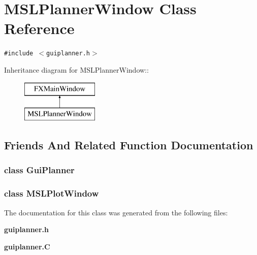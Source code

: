 \section{MSLPlanner\-Window  Class Reference}
\label{classMSLPlannerWindow}
{\tt \#include $<$guiplanner.h$>$}

Inheritance diagram for MSLPlanner\-Window::\begin{figure}[H]
\begin{center}
\leavevmode
\includegraphics[height=2cm]{classMSLPlannerWindow}
\end{center}
\end{figure}


\subsection{Friends And Related Function Documentation}
\subsubsection{\setlength{\rightskip}{0pt plus 5cm}class Gui\-Planner\hspace{0.3cm}{\tt  [friend]}}\label{classMSLPlannerWindow_l0}


\subsubsection{\setlength{\rightskip}{0pt plus 5cm}class MSLPlot\-Window\hspace{0.3cm}{\tt  [friend]}}\label{classMSLPlannerWindow_l1}




The documentation for this class was generated from the following files:\begin{CompactItemize}
\item 
{\bf guiplanner.h}\item 
{\bf guiplanner.C}\end{CompactItemize}
